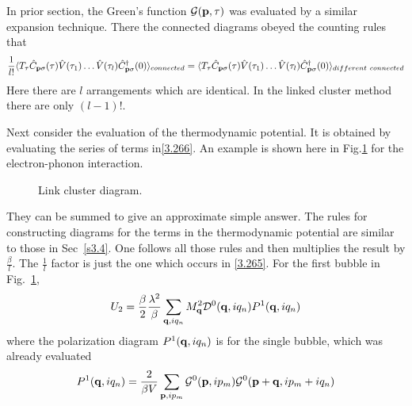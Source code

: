 In prior section, the Green's function $\mathcal{G}(\mathbf{p},\tau)$ was evaluated by a similar expansion technique.
There the connected diagrams obeyed the counting rules that
\begin{equation}
    \frac{1}{l!} \langle T_\tau \hat{C}_{\mathbf{p}\sigma}(\tau) \hat{V}(\tau_1) \dots \hat{V}(\tau_l) \hat{C}^\dagger_{\mathbf{p}\sigma}(0) \rangle_{connected} = \langle T_\tau \hat{C}_{\mathbf{p}\sigma}(\tau) \hat{V}(\tau_1) \dots \hat{V}(\tau_l) \hat{C}^\dagger_{\mathbf{p}\sigma}(0) \rangle_{different~connected}    \label{3.276}
\end{equation}
Here there are $l\! $ arrangements which are identical.
In the linked cluster method there are only $(l-1)! $.

Next consider the evaluation of the thermodynamic potential.
It is obtained by evaluating the series of terms in\eqref{3.266}.
An example is shown here in Fig.\ref{fig:3.9} for the electron-phonon interaction.
\begin{figure}[h]
    \centering
    \caption{Link cluster diagram.}%
    \label{fig:3.9}
\end{figure}
They can be summed to give an approximate simple answer.
The rules for constructing diagrams for the terms in the thermodynamic potential are similar to those in Sec~\ref{s3.4}.
One follows all those rules and then multiplies the result by $\frac{\beta}{l}$.
The $ \frac{1}{l} $ factor is just the one which occurs in \eqref{3.265}.
For the first bubble in Fig.~\ref{fig:3.9},
\begin{equation}
    U_2 = \frac{\beta}{2} \frac{\lambda^2}{\beta} \sum_{\mathbf{q},iq_n} M^2_{\mathbf{q}} \mathcal{D}^0(\mathbf{q},iq_n) P^1(\mathbf{q},iq_n)   \label{3.280}
\end{equation}
where the polarization diagram $P^1(\mathbf{q},iq_n)$ is for the single bubble, which was already evaluated
\begin{equation}
    P^1(\mathbf{q},iq_n) = \frac{2}{\beta V} \sum_{\mathbf{p},ip_m} \mathcal{G}^0(\mathbf{p},ip_m) \mathcal{G}^0(\mathbf{p}+\mathbf{q},ip_m+iq_n)  \label{3.281}
\end{equation}
